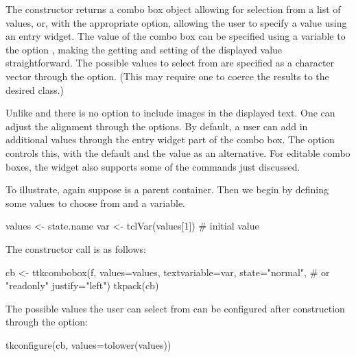 The  constructor returns a combo box object
allowing for selection from a list of values, or, with the appropriate
option, allowing the user to specify a value using an entry
widget. The value of the combo box can be specified using a \TCL\/
variable to the option , making the
getting and setting of the displayed value straightforward. The
possible values to select from are specified as a character vector
through the  option. (This may require one
to coerce the results to the desired class.)

Unlike \GTK{} and \Qt{} there is no option to include images in the
displayed text. One can adjust the alignment through the
 options.  By default, a user can add in
additional values through the entry widget part of the combo box. The
 option controls this, with the default
 and the value  as an alternative. For
editable combo boxes, the widget also supports some of the
 commands just discussed.


To illustrate, again suppose  is a parent container. Then we
begin by defining some values to choose from and a \TCL\/ variable.


\begin{Schunk}
\begin{Sinput}
 values <- state.name
 var <- tclVar(values[1])              # initial value
\end{Sinput}
\end{Schunk}

The constructor call is as follows:
\begin{Schunk}
\begin{Sinput}
 cb <- ttkcombobox(f,
                   values=values,
                   textvariable=var,
                   state="normal",     # or "readonly"
                   justify="left")
 tkpack(cb)
\end{Sinput}
\end{Schunk}


The possible values the user can select from can be configured after
construction through the  option:
\begin{Schunk}
\begin{Sinput}
 tkconfigure(cb, values=tolower(values))
\end{Sinput}
\end{Schunk}

